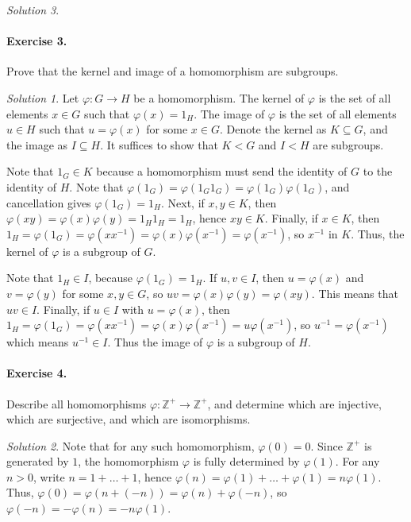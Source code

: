 \documentclass[11pt]{report}
\def\Z{\mathbb{Z}}
\theoremstyle{remark}
\newtheorem*{solution}{Solution}
\begin{document}
\begin{solution}
    \paragraph{Exercise 3.} Prove that the kernel and image of a homomorphism are
    subgroups.
    \begin{solution}
        Let $\varphi\colon G \to H$ be a homomorphism. The kernel of $\varphi$ is the set
        of all elements $x \in G$ such that $\varphi(x) = 1_H$. The image of
        $\varphi$ is the set of all elements $u \in H$ such that $u = \varphi(x)$
        for some $x \in G$. Denote the kernel as $K \subseteq G$, and the image as
        $I \subseteq H$. It suffices to show that $K < G$ and $I < H$ are subgroups.

        Note that $1_G \in K$ because a homomorphism must send the identity of $G$
        to the identity of $H$. Note that $\varphi(1_G) = \varphi(1_G 1_G) =
        \varphi(1_G)\varphi(1_G)$, and cancellation gives $\varphi(1_G) = 1_H$.
        Next, if $x, y \in K$, then $\varphi(xy) = \varphi(x)\varphi(y) = 1_H 1_H =
        1_H$, hence $xy \in K$. Finally, if $x \in K$, then $1_H = \varphi(1_G) =
        \varphi(x x^{-1}) = \varphi(x)\varphi(x^{-1}) = \varphi(x^{-1})$, so
        $x^{-1}$ in $K$. Thus, the kernel of $\varphi$ is a subgroup of $G$.

        Note that $1_H \in I$, because $\varphi(1_G) = 1_H$. If $u, v \in I$, then
        $u = \varphi(x)$ and $v = \varphi(y)$ for some $x, y \in G$, so $uv =
        \varphi(x)\varphi(y) = \varphi(xy)$. This means that $uv \in I$. Finally, if
        $u \in I$ with $u = \varphi(x)$, then $1_H = \varphi(1_G) = \varphi(x
        x^{-1}) = \varphi(x)\varphi(x^{-1}) = u \varphi(x^{-1})$, so $u^{-1} =
        \varphi(x^{-1})$ which means $u^{-1} \in I$. Thus the image of $\varphi$ is
        a subgroup of $H$.
    \end{solution}
    
    \paragraph{Exercise 4.} Describe all homomorphisms $\varphi\colon \Z^+ \to
    \Z^+$, and determine which are injective, which are surjective, and which are
    isomorphisms.
    \begin{solution}
        Note that for any such homomorphism, $\varphi(0) = 0$. Since $\Z^+$ is
        generated by $1$, the homomorphism $\varphi$ is fully determined by
        $\varphi(1)$. For any $n > 0$, write $n = 1 + \dots + 1$, hence $\varphi(n)
        = \varphi(1) + \dots + \varphi(1) = n\varphi(1)$. Thus, $\varphi(0) =
        \varphi(n + (-n)) = \varphi(n) + \varphi(-n)$, so $\varphi(-n) = -\varphi(n)
        = -n\varphi(1)$.


\end{solution}
\end{solution}
\end{document}

